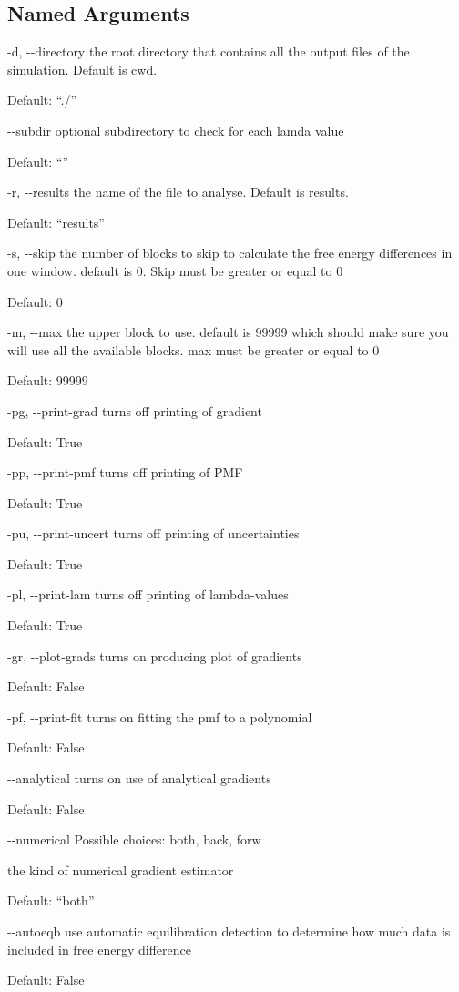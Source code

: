 \documentclass[letterpaper,10pt,english]{sphinxmanual}
\begin{document}
\subsection{Named Arguments}
\label{\detokenize{tools:Named Arguments}}\begin{optionlist}{3cm}
\item [-d, -{-}directory]  
the root directory that contains all the output files of the simulation. Default is cwd.

Default: “./”
\item [-{-}subdir]  
optional subdirectory to check for each lamda value

Default: “”
\item [-r, -{-}results]  
the name of the file to analyse. Default is results.

Default: “results”
\item [-s, -{-}skip]  
the number of blocks to skip to calculate the free energy differences in one window. default is 0. Skip must be greater or equal to 0

Default: 0
\item [-m, -{-}max]  
the upper block to use. default is 99999 which should make sure you will use all the available blocks. max must be greater or equal to 0

Default: 99999
\item [-pg, -{-}print-grad]  
turns off printing of gradient

Default: True
\item [-pp, -{-}print-pmf]  
turns off printing of PMF

Default: True
\item [-pu, -{-}print-uncert]  
turns off printing of uncertainties

Default: True
\item [-pl, -{-}print-lam]  
turns off printing of lambda-values

Default: True
\item [-gr, -{-}plot-grads]  
turns on producing plot of gradients

Default: False
\item [-pf, -{-}print-fit]  
turns on fitting the pmf to a polynomial

Default: False
\item [-{-}analytical]  
turns on use of analytical gradients

Default: False
\item [-{-}numerical]  
Possible choices: both, back, forw

the kind of numerical gradient estimator

Default: “both”
\item [-{-}autoeqb]  
use automatic equilibration detection to determine how much data is included in free energy difference

Default: False
\end{optionlist}
\end{document}
